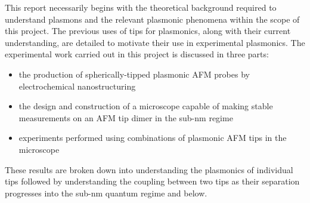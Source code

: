 \documentclass[12pt, a4paper, twoside]{book}
\begin{document}
This report necessarily begins with the theoretical background required to understand plasmons and the relevant plasmonic phenomena within the scope of this project. The previous uses of tips for plasmonics, along with their current understanding, are detailed to motivate their use in experimental plasmonics.
The experimental work carried out in this project is discussed in three parts:
\begin{itemize}
\item the production of spherically-tipped plasmonic AFM probes by electrochemical nanostructuring
\item the design and construction of a microscope capable of making stable measurements on an AFM tip dimer in the sub-nm regime
\item experiments performed using combinations of plasmonic AFM tips in the microscope
\end{itemize}
These results are broken down into understanding the plasmonics of individual tips followed by understanding the coupling between two tips as their separation progresses into the sub-nm quantum regime and below.

\ifstandalone
\begin{singlespace}
\fontsize{8pt}{1em}\selectfont
\printbibliography[notcategory=fullcited]
\end{singlespace}
\fi
\end{document}
